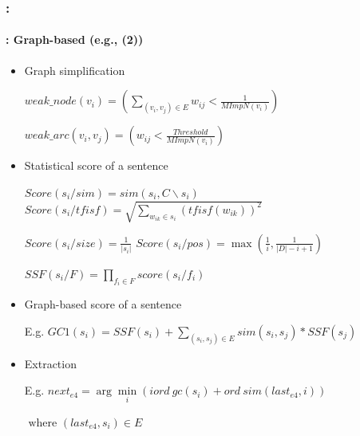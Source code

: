 \documentclass[xcolor=table]{beamer}
\begin{document}
\begin{frame}
	\frametitle{\insertshortsubtitle: \insertsection}
	\framesubtitle{\insertsubsection: Graph-based (e.g., \cite{21-aries-al} (2))}
	
	\vspace{-6pt}
	\begin{itemize}
		\item Graph simplification
		
		\hspace{.5cm}$weak\_node(v_i) = ( \sum_{(v_i, v_j) \in E} w_{ij} < \frac{1}{MImpN(v_i)} )$ 
		
		\hspace{.5cm}$weak\_arc(v_i, v_j) = ( w_{ij} < \frac{Threshold}{MImpN(v_i)})$
		
		\item Statistical score of a sentence
		
		\hspace{.5cm}$ Score(s_i/ sim) = sim(s_i, C\backslash s_i) $
		$Score(s_i/ tfisf) = \sqrt{\sum\limits_{w_{ik} \in s_i} (tfisf(w_{ik}))^2}$
		
		\hspace{.5cm}$Score(s_i/ size) = \frac{1}{|s_i|}$
		$Score(s_i/ pos) = \max (\frac{1}{i}, \frac{1}{|D| - i + 1})$
		
		\hspace{.5cm}$SSF(s_i/ F) = \prod_{f_i \in F} score(s_i/f_i)$
		
		\item Graph-based score of a sentence
		
		\hspace{.5cm}E.g. $GC1(s_i) = SSF(s_i) + \sum\limits_{(s_i, s_j) \in E} sim(s_i, s_j) * SSF(s_j)$
		
		\item Extraction
		
		\hspace{.5cm}E.g. $ next_{e4}  =  \arg\min\limits_i (iord\ gc(s_i) + ord\ sim(last_{e4}, i))$ 
		
		\hspace{3cm}$ \text{ where } (last_{e4}, s_i) \in E $
	\end{itemize}
	
\end{frame}
\end{document}
